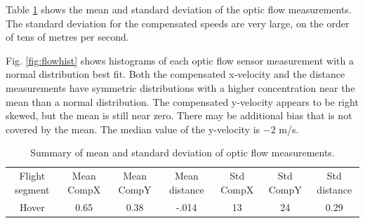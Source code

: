 \documentclass{article}
\begin{document}

Table \ref{tab:flow} shows the mean and standard deviation of the optic flow measurements. The standard deviation for the compensated speeds are very large, on the order of tens of metres per second. 

Fig. \ref{fig:flowhist} shows histograms of each optic flow sensor measurement with a normal distribution best fit. Both the compensated x-velocity and the distance measurements have symmetric distributions with a higher concentration near the mean than a normal distribution. The compensated y-velocity appears to be right skewed, but the mean is still near zero. There may be additional bias that is not covered by the mean. The median value of the y-velocity is $-2$ m/s.

\begin{table}[tb!]
\begin{tabular}{c|c|c|c|c|c|c}
Flight segment & Mean CompX & Mean CompY & Mean distance & Std CompX & Std CompY & Std distance\\
Hover & 0.65 & 0.38 & -.014 & 13 & 24 & 0.29\\
\end{tabular}
\caption{Summary of mean and standard deviation of optic flow measurements.}
\label{tab:flow}
\end{table}
\end{document}
